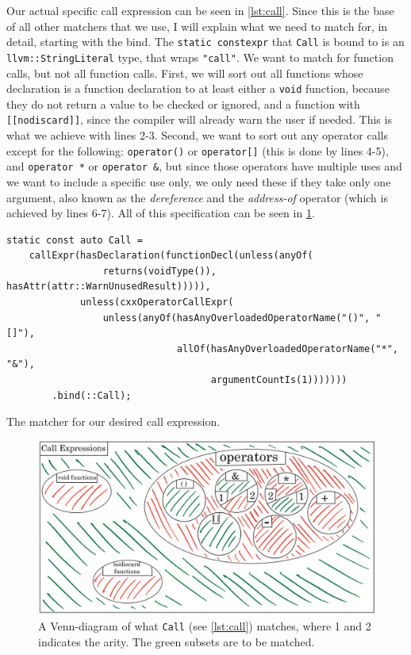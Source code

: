 Our actual specific call expression can be seen in \cref{lst:call}. Since this is the base of all other matchers
that we use, I will explain what we need to match for, in detail, starting with the bind. The \texttt{static constexpr} that \texttt{Call}
is bound to is an \texttt{llvm::StringLiteral} type, that wraps \texttt{"call"}.
We want to match for function calls, but not all function calls. First, we will sort out all functions whose declaration is a function
declaration to at least either a \texttt{void} function, because they do not return a value to be checked or ignored, and a
function with \texttt{[[nodiscard]]}, since the compiler will already warn the user if needed. This is what we achieve with lines
2-3. Second, we want to sort out any operator calls except for the following: \texttt{operator()} or \texttt{operator[]}
(this is done by lines 4-5), and \texttt{operator *} or \texttt{operator &}, but since those operators have multiple uses and
we want to include a specific use only, we only need these if they take only one argument, also known as the \emph{dereference}
and the \emph{address-of} operator (which is achieved by lines 6-7).
All of this specification can be seen in \cref{fig:venn-call}.


\begin{listing}[H]
  \begin{verbatim}
static const auto Call =
	callExpr(hasDeclaration(functionDecl(unless(anyOf(
				 returns(voidType()), hasAttr(attr::WarnUnusedResult))))),
			 unless(cxxOperatorCallExpr(
				 unless(anyOf(hasAnyOverloadedOperatorName("()", "[]"),
							  allOf(hasAnyOverloadedOperatorName("*", "&"),
									argumentCountIs(1)))))))
		.bind(::Call);
  \end{verbatim}
  \caption{The matcher for our desired call expression.}\label{lst:call}
\end{listing}

\begin{figure}[H]
	\includegraphics[width=\linewidth]{images/venn_call.png}
  \caption{A Venn-diagram of what \texttt{Call} (see \cref{lst:call}) matches, where 1 and 2 indicates the arity. The green subsets are to be matched.}
	\label{fig:venn-call}
\end{figure}

